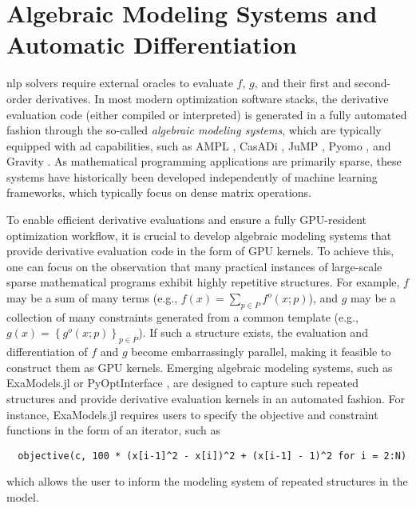\documentclass{article}
\begin{document}
\section{Algebraic Modeling Systems and Automatic Differentiation}\label{eqn:ad}
\Gls*{nlp} solvers require external oracles to evaluate $f$, $g$, and their first and second-order derivatives. In most modern optimization software stacks, the derivative evaluation code (either compiled or interpreted) is generated in a fully automated fashion through the so-called \emph{algebraic modeling systems}, which are typically equipped with \gls*{ad} capabilities, such as AMPL \cite{fourerModelingLanguageMathematical1990}, CasADi \cite{anderssonCasADiSoftwareFramework2019}, JuMP \cite{dunningJuMPModelingLanguage2017}, Pyomo \cite{hartPyomoModelingSolving2011}, and Gravity \cite{hijaziGravityMathematicalModeling2018}. As mathematical programming applications are primarily sparse, these systems have historically been developed independently of machine learning frameworks, which typically focus on dense matrix operations.

To enable efficient derivative evaluations and ensure a fully GPU-resident optimization workflow, it is crucial to develop algebraic modeling systems that provide derivative evaluation code in the form of GPU kernels. To achieve this, one can focus on the observation that many practical instances of large-scale sparse mathematical programs exhibit highly repetitive structures. For example, $f$ may be a sum of many terms (e.g., $f(x) = \sum_{p\in P} f^o(x; p)$), and $g$ may be a collection of many constraints generated from a common template (e.g., $g(x) = \left\{g^o(x; p)\right\}_{p\in P}$). If such a structure exists, the evaluation and differentiation of $f$ and $g$ become embarrassingly parallel, making it feasible to construct them as GPU kernels. Emerging algebraic modeling systems, such as ExaModels.jl \cite{shinAcceleratingOptimalPower2024} or PyOptInterface \cite{yangPyOptInterfaceDesignImplementation2024}, are designed to capture such repeated structures and provide derivative evaluation kernels in an automated fashion. For instance, ExaModels.jl requires users to specify the objective and constraint functions in the form of an iterator, such as
\begin{verbatim}
  objective(c, 100 * (x[i-1]^2 - x[i])^2 + (x[i-1] - 1)^2 for i = 2:N)
\end{verbatim}
which allows the user to inform the modeling system of repeated structures in the model.
\end{document}
